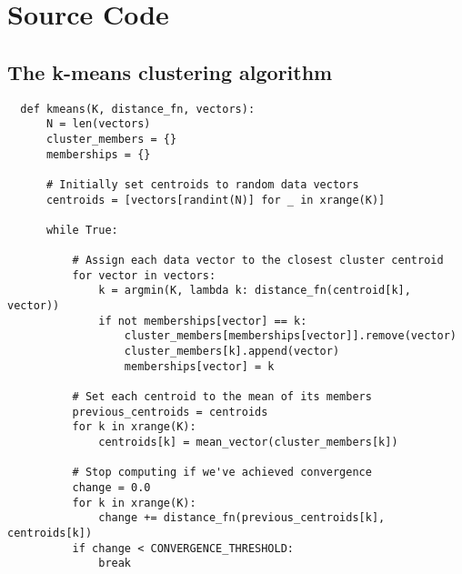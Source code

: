 \chapter{Source Code}

\label{AppendixB}


\section{The k-means clustering algorithm}
\label{code:kmeans}

\begin{verbatim}
  def kmeans(K, distance_fn, vectors):
      N = len(vectors)
      cluster_members = {}
      memberships = {}

      # Initially set centroids to random data vectors
      centroids = [vectors[randint(N)] for _ in xrange(K)]

      while True:

          # Assign each data vector to the closest cluster centroid
          for vector in vectors:
              k = argmin(K, lambda k: distance_fn(centroid[k], vector))
              if not memberships[vector] == k:
                  cluster_members[memberships[vector]].remove(vector)
                  cluster_members[k].append(vector)
                  memberships[vector] = k

          # Set each centroid to the mean of its members
          previous_centroids = centroids
          for k in xrange(K):
              centroids[k] = mean_vector(cluster_members[k])

          # Stop computing if we've achieved convergence
          change = 0.0
          for k in xrange(K):
              change += distance_fn(previous_centroids[k], centroids[k])
          if change < CONVERGENCE_THRESHOLD:
              break
\end{verbatim}
